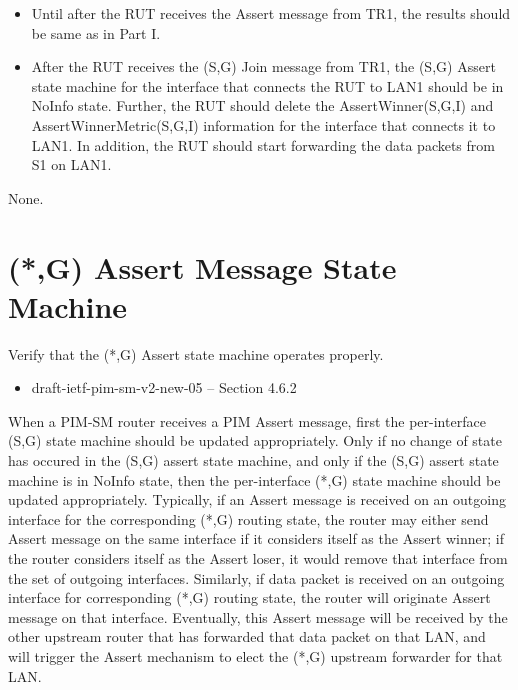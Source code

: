 \documentclass[11pt]{report}
\begin{document}

\begin{itemize}

  \item Until after the RUT receives the Assert message from TR1, the
  results should be same as in Part I.

  \item After the RUT receives the (S,G) Join message from TR1, the (S,G)
  Assert state machine for the interface that connects the RUT to LAN1 should
  be in NoInfo state.
  Further, the RUT should delete the AssertWinner(S,G,I) and
  AssertWinnerMetric(S,G,I) information for the interface that connects it to
  LAN1.
  In addition, the RUT should start forwarding the data packets from S1 on
  LAN1.

\end{itemize}

None.

\newpage
\section{(*,G) Assert Message State Machine}

Verify that the (*,G) Assert state machine operates properly.

\begin{itemize}
  \item draft-ietf-pim-sm-v2-new-05 -- Section 4.6.2
\end{itemize}

When a PIM-SM router receives a PIM Assert message, first the per-interface
(S,G) state machine should be updated appropriately. Only if no change of
state has occured in the (S,G) assert state machine, and only if the (S,G)
assert state machine is in NoInfo state, then the per-interface
(*,G) state machine should be updated appropriately. Typically, if an
Assert message is received on an outgoing interface for the corresponding
(*,G) routing state, the router may either send Assert message on the
same interface if it considers itself as the Assert winner; if the router
considers itself as the Assert loser, it would remove that interface from the
set of outgoing interfaces. Similarly, if data packet is received on an
outgoing interface for corresponding (*,G) routing state, the router will
originate Assert message on that interface. Eventually, this Assert message
will be received by the other upstream router that has forwarded that data
packet on that LAN, and will trigger the Assert mechanism to elect the (*,G)
upstream forwarder for that LAN.
\end{document}
